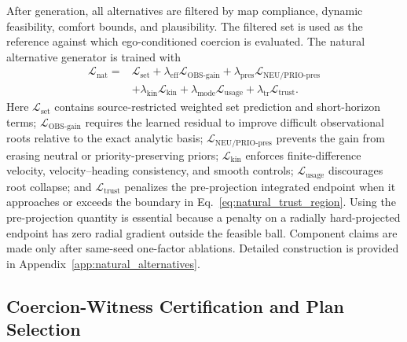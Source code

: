 \documentclass[10pt]{article}
\begin{document}
After generation, all alternatives are filtered by map compliance, dynamic feasibility, comfort bounds, and plausibility. The filtered set is used as the reference against which ego-conditioned coercion is evaluated. The natural alternative generator is trained with
\begin{equation}
\begin{aligned}
    \mathcal{L}_{\mathrm{nat}}
    ={}&
    \mathcal{L}_{\mathrm{set}}
    +\lambda_{\mathrm{eff}}\mathcal{L}_{\mathrm{OBS\mbox{-}gain}}
    +\lambda_{\mathrm{pres}}\mathcal{L}_{\mathrm{NEU/PRIO\mbox{-}pres}}\\
    &+\lambda_{\mathrm{kin}}\mathcal{L}_{\mathrm{kin}}
    +\lambda_{\mathrm{mode}}\mathcal{L}_{\mathrm{usage}}
    +\lambda_{\mathrm{tr}}\mathcal{L}_{\mathrm{trust}} .
\end{aligned}
\end{equation}
Here $\mathcal{L}_{\mathrm{set}}$ contains source-restricted weighted set prediction and short-horizon terms; $\mathcal{L}_{\mathrm{OBS\mbox{-}gain}}$ requires the learned residual to improve difficult observational roots relative to the exact analytic basis; $\mathcal{L}_{\mathrm{NEU/PRIO\mbox{-}pres}}$ prevents the gain from erasing neutral or priority-preserving priors; $\mathcal{L}_{\mathrm{kin}}$ enforces finite-difference velocity, velocity--heading consistency, and smooth controls; $\mathcal{L}_{\mathrm{usage}}$ discourages root collapse; and $\mathcal{L}_{\mathrm{trust}}$ penalizes the pre-projection integrated endpoint when it approaches or exceeds the boundary in Eq.~\eqref{eq:natural_trust_region}. Using the pre-projection quantity is essential because a penalty on a radially hard-projected endpoint has zero radial gradient outside the feasible ball. Component claims are made only after same-seed one-factor ablations. Detailed construction is provided in Appendix~\ref{app:natural_alternatives}.

\subsection{Coercion-Witness Certification and Plan Selection}
\label{sec:method_certification}
\end{document}
